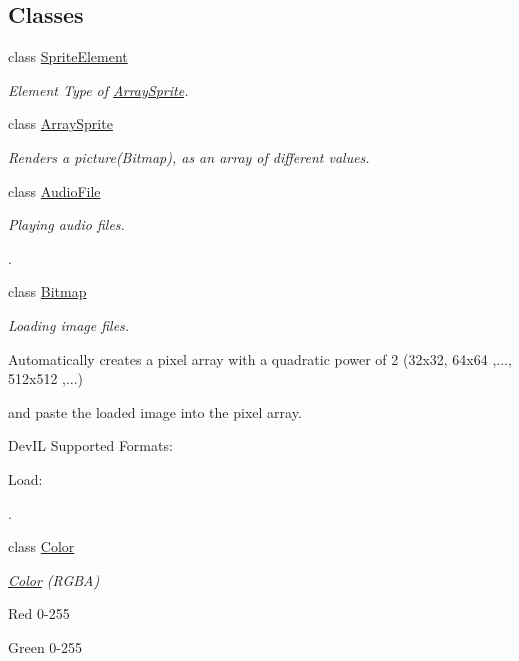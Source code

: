 \subsection*{Classes}
\begin{DoxyCompactItemize}
\item 
class \hyperlink{class_f2_c_1_1_sprite_element}{SpriteElement}
\begin{DoxyCompactList}\small\item\em Element Type of \hyperlink{class_f2_c_1_1_array_sprite}{ArraySprite}. \item\end{DoxyCompactList}\item 
class \hyperlink{class_f2_c_1_1_array_sprite}{ArraySprite}
\begin{DoxyCompactList}\small\item\em Renders a picture(Bitmap), as an array of different values. \item\end{DoxyCompactList}\item 
class \hyperlink{class_f2_c_1_1_audio_file}{AudioFile}
\begin{DoxyCompactList}\small\item\em Playing audio files. \par
. \item\end{DoxyCompactList}\item 
class \hyperlink{class_f2_c_1_1_bitmap}{Bitmap}
\begin{DoxyCompactList}\small\item\em Loading image files. \par
 Automatically creates a pixel array with a quadratic power of 2 (32x32, 64x64 ,..., 512x512 ,...) \par
 and paste the loaded image into the pixel array. \par
 DevIL Supported Formats: \par
 Load: \par
. \item\end{DoxyCompactList}\item 
class \hyperlink{class_f2_c_1_1_color}{Color}
\begin{DoxyCompactList}\small\item\em \hyperlink{class_f2_c_1_1_color}{Color} (RGBA) \par
 Red 0-\/255 \par
 Green 0-\/255 \par

\end{DoxyCompactList}
\end{DoxyCompactItemize}
